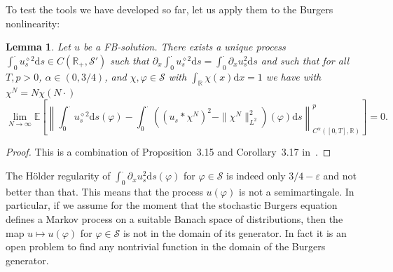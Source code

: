 \documentclass[a4paper,11pt]{article}
\newcommand{\cdummy}{\cdot}
\newcommand{\mathd}{\mathrm{d}}
\newtheorem{lemma}[theorem]{Lemma}
\newcommand{\CS}{\mathscr{S}}
\newcommand{\1}{\mathds{1}}
\begin{document}
To test the tools we have developed so far, let us apply them to the Burgers
nonlinearity:

\begin{lemma}
  Let $u$ be a FB-solution. There exists a unique process $\int_0^{\cdummy}
  u_s^{\diamond 2} \mathd s \in C (\mathbb{R}_+, \CS')$ such that
  $\partial_x \int_0^{\cdummy} u_s^{\diamond 2} \mathd s = \int_0^{\cdummy}
  \partial_x u_s^2 \mathd s$ and such that for all $T, p > 0$, $\alpha \in (0,
  3 / 4)$, and $\chi, \varphi \in \mathcal{S}$ with $\int_{\mathbb{R}} \chi
  (x) \mathd x = 1$ we have with $\chi^N = N \chi (N \cdummy)$
  \[ \lim_{N \rightarrow \infty} \mathbb{E} \left[ \left\| \int_0^{\cdummy}
     u_s^{\diamond 2} \mathd s (\varphi) - \int_0^{\cdummy} ((u_s \ast
     \chi^N)^2 - \| \chi^N \|_{L^2}^2) (\varphi) \mathd s
     \right\|^p_{C^{\alpha} ([0, T], \mathbb{R})} \right] = 0. \]
\end{lemma}

\begin{proof}
  This is a combination of Proposition~3.15 and Corollary~3.17
  in~{\cite{GP16}}.
\end{proof}

The H{\"o}lder regularity of $\int_0^{\cdummy} \partial_x u_s^2 \mathd s (\varphi)$
for $\varphi \in \mathcal{S}$ is indeed only $3 / 4 - \varepsilon$ and not
better than that. This means that the process $u (\varphi)$ is not a
semimartingale. In particular, if we assume for
the moment that the stochastic Burgers equation defines a Markov process on a
suitable Banach space of distributions, then the map $u \mapsto u (\varphi)$
for $\varphi \in \CS$ is not in the domain of its generator. In fact it is an open problem to find any nontrivial
function in the domain of the Burgers generator.
\end{document}
